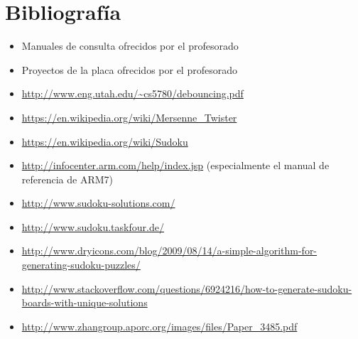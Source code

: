 \documentclass[12pt,letterpaper]{article}
\begin{document}
\clearpage
\section{Bibliografía}
\begin{itemize}
  \item Manuales de consulta ofrecidos por el profesorado
  \item Proyectos de la placa ofrecidos por el profesorado
  \item \url{http://www.eng.utah.edu/~cs5780/debouncing.pdf}
  \item \url{https://en.wikipedia.org/wiki/Mersenne_Twister}
  \item \url{https://en.wikipedia.org/wiki/Sudoku}
  \item \url{http://infocenter.arm.com/help/index.jsp} (especialmente
    el manual de referencia de ARM7)
  \item \url{http://www.sudoku-solutions.com/}
  \item \url{http://www.sudoku.taskfour.de/}
  \item
    \url{http://www.dryicons.com/blog/2009/08/14/a-simple-algorithm-for-generating-sudoku-puzzles/}
  \item
    \url{http://www.stackoverflow.com/questions/6924216/how-to-generate-sudoku-boards-with-unique-solutions}
  \item \url{http://www.zhangroup.aporc.org/images/files/Paper_3485.pdf}
\end{itemize}
\end{document}
